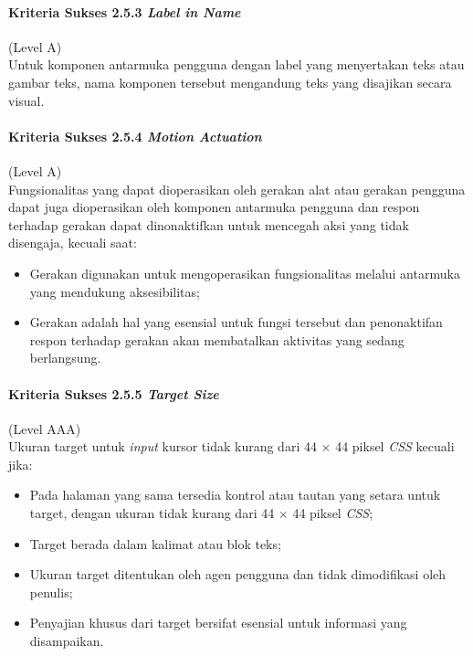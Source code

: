 \paragraph{Kriteria Sukses 2.5.3 \textit{Label in Name}}
\label{sec:kriteria_sukses_2.5.3}
(Level A)\\

Untuk komponen antarmuka pengguna dengan label yang menyertakan teks atau gambar teks, nama komponen tersebut mengandung teks yang disajikan secara visual. 

\paragraph{Kriteria Sukses 2.5.4 \textit{Motion Actuation}}
\label{sec:kriteria_sukses_2.5.4}
(Level A)\\

Fungsionalitas yang dapat dioperasikan oleh gerakan alat atau gerakan pengguna dapat juga dioperasikan oleh komponen antarmuka pengguna dan respon terhadap gerakan dapat dinonaktifkan untuk mencegah aksi yang tidak disengaja, kecuali saat:
\begin{itemize}
	\item Gerakan digunakan untuk mengoperasikan fungsionalitas melalui antarmuka yang mendukung aksesibilitas;
	\item Gerakan adalah hal yang esensial untuk fungsi tersebut dan penonaktifan respon terhadap gerakan akan membatalkan aktivitas yang sedang berlangsung.
\end{itemize}

\paragraph{Kriteria Sukses 2.5.5 \textit{Target Size}}
\label{sec:kriteria_sukses_2.5.5}
(Level AAA)\\

Ukuran target untuk \textit{input} kursor tidak kurang dari 44 $\times$ 44 piksel \textit{CSS} kecuali jika:

\begin{itemize}
	\item Pada halaman yang sama tersedia kontrol atau tautan yang setara untuk target, dengan ukuran tidak kurang dari 44 $\times$ 44 piksel \textit{CSS};  
	\item Target berada dalam kalimat atau blok teks;
	\item Ukuran target ditentukan oleh agen pengguna dan tidak dimodifikasi oleh penulis;
	\item Penyajian khusus dari target bersifat esensial untuk informasi yang disampaikan.
\end{itemize}

